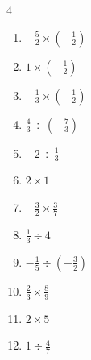 \begin{multicols}{4}
\begin{enumerate}
  \item $\displaystyle -\frac{5}{2}\times{}\left(-\frac{1}{2}\right)$


  \item $\displaystyle 1\times{}\left(-\frac{1}{2}\right)$


\columnbreak %

  \item $\displaystyle -\frac{1}{3}\times{}\left(-\frac{1}{2}\right)$


  \item $\displaystyle \frac{4}{3}\div{}\left(-\frac{7}{3}\right)$


  \item $\displaystyle -2\div{}\frac{1}{3}$

        \phantom{$\displaystyle =-6$}

  \item $\displaystyle 2\times{}1$

        \phantom{$\displaystyle =2$}

  \item $\displaystyle -\frac{3}{2}\times{}\frac{3}{7}$


  \item $\displaystyle \frac{1}{3}\div{}4$


  \item $\displaystyle -\frac{1}{5}\div{}\left(-\frac{3}{2}\right)$


  \item $\displaystyle \frac{2}{3}\times{}\frac{8}{9}$


  \item $\displaystyle 2\times{}5$

        \phantom{$\displaystyle =10$}

  \item $\displaystyle 1\div{}\frac{4}{7}$


\end{enumerate}
\end{multicols}
